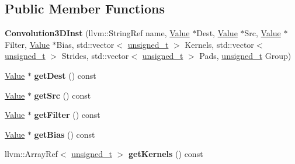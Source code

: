 \subsection*{Public Member Functions}
\begin{DoxyCompactItemize}
\item 
\mbox{\label{classglow_1_1_convolution3_d_inst_a844a10d6c6664308ca7b76e432e85049}} 
{\bfseries Convolution3\+D\+Inst} (llvm\+::\+String\+Ref name, \hyperlink{classglow_1_1_value}{Value} $\ast$Dest, \hyperlink{classglow_1_1_value}{Value} $\ast$Src, \hyperlink{classglow_1_1_value}{Value} $\ast$Filter, \hyperlink{classglow_1_1_value}{Value} $\ast$Bias, std\+::vector$<$ \hyperlink{namespaceglow_a0ca574644e1e42ef193a9947fb4d8911}{unsigned\+\_\+t} $>$ Kernels, std\+::vector$<$ \hyperlink{namespaceglow_a0ca574644e1e42ef193a9947fb4d8911}{unsigned\+\_\+t} $>$ Strides, std\+::vector$<$ \hyperlink{namespaceglow_a0ca574644e1e42ef193a9947fb4d8911}{unsigned\+\_\+t} $>$ Pads, \hyperlink{namespaceglow_a0ca574644e1e42ef193a9947fb4d8911}{unsigned\+\_\+t} Group)
\item 
\mbox{\label{classglow_1_1_convolution3_d_inst_aa232776d5dbab89c51bd413baad4e049}} 
\hyperlink{classglow_1_1_value}{Value} $\ast$ {\bfseries get\+Dest} () const
\item 
\mbox{\label{classglow_1_1_convolution3_d_inst_a99d1e14c3e76e7776a8847156b6774dd}} 
\hyperlink{classglow_1_1_value}{Value} $\ast$ {\bfseries get\+Src} () const
\item 
\mbox{\label{classglow_1_1_convolution3_d_inst_a5bc52f6e3bb6c9c0aa6aa8a8c859cc76}} 
\hyperlink{classglow_1_1_value}{Value} $\ast$ {\bfseries get\+Filter} () const
\item 
\mbox{\label{classglow_1_1_convolution3_d_inst_a8c103a98edca743e88ece3d1714a2a05}} 
\hyperlink{classglow_1_1_value}{Value} $\ast$ {\bfseries get\+Bias} () const
\item 
\mbox{\label{classglow_1_1_convolution3_d_inst_a24fe022e2a364a618e270086468ff026}} 
llvm\+::\+Array\+Ref$<$ \hyperlink{namespaceglow_a0ca574644e1e42ef193a9947fb4d8911}{unsigned\+\_\+t} $>$ {\bfseries get\+Kernels} () const

\end{DoxyCompactItemize}
